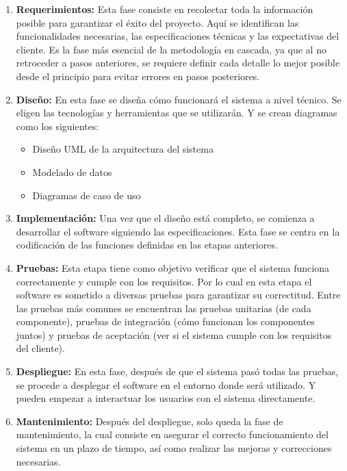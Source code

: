 \begin{enumerate}
    \item \textbf{Requerimientos:} Esta fase consiste en recolectar toda la informaci\'on posible para garantizar el \'exito del proyecto. Aqu\'i se identifican las funcionalidades necesarias, las especificaciones t\'ecnicas y las expectativas del cliente. Es la fase m\'as esencial de la metodolog\'ia en cascada, ya que al no retroceder a pasos anteriores, se requiere definir cada detalle lo mejor posible desde el principio para evitar errores en pasos posteriores.

    \item \textbf{Dise\~no: } En esta fase se dise\~{n}a c\'omo funcionar\'a el sistema a nivel t\'ecnico. Se eligen las tecnolog\'ias y herramientas que se utilizar\'an. Y se crean diagramas como los siguientes:

    \begin{itemize}
        \item Dise\~no UML de la arquitectura del sistema
        \item Modelado de datos
        \item Diagramas de caso de uso
    \end{itemize}
    \item \textbf{Implementaci\'on: } Una vez que el dise\~{n}o est\'a completo, se comienza a desarrollar el software siguiendo las especificaciones. Esta fase se centra en la codificaci\'on de las funciones definidas en las etapas anteriores.

    \item \textbf{Pruebas: } Esta etapa tiene como objetivo verificar que el sistema funciona correctamente y cumple con los requisitos. Por lo cual en esta etapa el software es sometido a diversas pruebas para garantizar su correctitud. Entre las pruebas m\'as comunes se encuentran las pruebas unitarias (de cada componente), pruebas de integraci\'on (c\'omo funcionan los componentes juntos) y pruebas de aceptaci\'on (ver si el sistema cumple con los requisitos del cliente).

    \item \textbf{Despliegue: } En esta fase, despu\'es de que el sistema pas\'o todas las pruebas, se procede a desplegar el software en el entorno donde ser\'a utilizado. Y pueden empezar a interactuar los usuarios con el sistema directamente.

    \item \textbf{Mantenimiento:}  Despu\'es del despliegue, solo queda la fase de mantenimiento, la cual consiste en asegurar el correcto funcionamiento del sistema en un plazo de tiempo, as\'i como realizar las mejoras y correcciones necesarias.

    
\end{enumerate}



